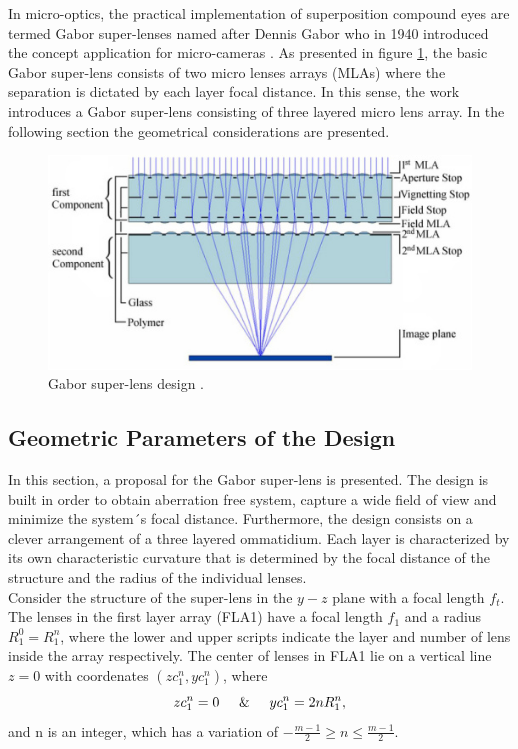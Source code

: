 In micro-optics, the practical implementation of superposition compound eyes are termed Gabor super-lenses \cite{stollberg2009gabor} named after Dennis Gabor who in 1940 introduced the concept application for micro-cameras \cite{DGaborSL}. As presented in figure \ref{fig:Gabor design}, the basic Gabor super-lens consists of two micro lenses arrays (MLAs) where the separation is dictated by each layer focal distance. In this sense, the work introduces a Gabor super-lens consisting of three layered micro lens array. In the following section the geometrical considerations are presented.\\ 

\begin{figure}[H]
    \centering
    \includegraphics[scale=0.60]{Figures/Gabor-Superlens.jpeg}
    \caption{Gabor super-lens design \cite{stollberg2009gabor} .}
    \label{fig:Gabor design}
\end{figure}

\subsection{Geometric Parameters of the Design}
In this section, a proposal for the Gabor super-lens is presented. The design is built in order to obtain aberration free system, capture a wide field of view and minimize the system´s focal distance. Furthermore, the design consists on a clever arrangement of a three layered ommatidium. Each layer is characterized by its own characteristic curvature that is determined by the focal distance of the structure and the radius of the individual lenses.\\

Consider the structure of the super-lens in the $y-z$ plane with a focal length $f_t$. The lenses in the first layer array (FLA1) have a focal length $f_1$ and a radius $R_1^0 = R_1^n$, where the lower and upper scripts indicate the layer and number of lens inside the array respectively. The center of lenses in FLA1 lie on a vertical line $z=0$ with coordenates $(zc_1^n,yc_1^n)$, where
\begin{equation}
    zc_1^n = 0 \hspace{0.5cm}\&\hspace{0.5cm} yc_1^n = 2nR_1^n ,
\end{equation}
and n is an integer, which has a variation of $-\frac{m-1}{2}\ge n \le \frac{m-1}{2}$. \\

